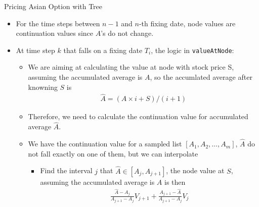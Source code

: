 \begin{frame}[fragile]{Pricing Asian Option with Tree}
\begin{itemize}
\item For the time steps between $n-1$ and $n$-th fixing date, node values are continuation values since $A$'s do not change.
\item At time step $k$ that falls on a fixing date $T_i$, the logic in \verb_valueAtNode_:
\begin{itemize}
\item We are aiming at calculating the value at node with stock price S, assuming the accumulated average is $A$, so the accumlated average after knowning $S$ is
\begin{align}
\hat A = (A \times i + S) / (i + 1)
\end{align}
\item Therefore, we need to calculate the continuation value for accumulated average $\hat A$.
\item We have the continuation value for a sampled list $[A_1, A_2, \ldots, A_m]$, $\hat A$ do not fall exactly on one of them, but we can interpolate
\begin{itemize}
\item Find the interval $j$ that $\hat A \in [A_{j}, A_{j+1}]$, the node value at $S$, assuming the accumulated average is $A$ is then
\begin{align*}
\frac{\hat A - A_j}{A_{j+1} - A_{j}} V_{j+1} + \frac{A_{j+1} - \hat A}{A_{j+1} - A_{j}} V_{j}
\end{align*}
\end{itemize}
\end{itemize}
\end{itemize}
\end{frame}

